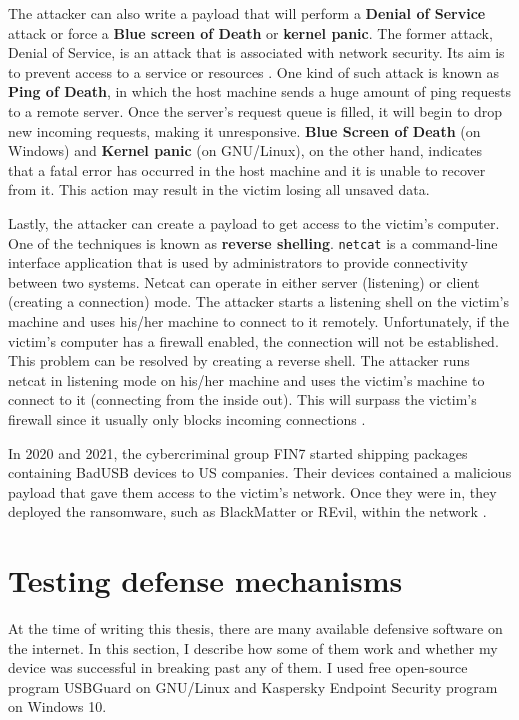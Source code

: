 The attacker can also write a payload that will perform a \textbf{Denial of Service} attack or force a \textbf{Blue screen of Death} or \textbf{kernel panic}. The former attack, Denial of Service, is an attack that is associated with network security. Its aim is to prevent access to a service or resources \cite{2008Ericson}. One kind of such attack is known as \textbf{Ping of Death}, in which the host machine sends a huge amount of ping requests to a remote server. Once the server's request queue is filled, it will begin to drop new incoming requests, making it unresponsive. \textbf{Blue Screen of Death} (on Windows) and \textbf{Kernel panic} (on GNU/Linux), on the other hand, indicates that a fatal error has occurred in the host machine and it is unable to recover from it. This action may result in the victim losing all unsaved data.

Lastly, the attacker can create a payload to get access to the victim's computer. One of the techniques is known as \textbf{reverse shelling}. \verb|netcat| is a command-line interface application that is used by administrators to provide connectivity between two systems. Netcat can operate in either server (listening) or client (creating a connection) mode. The attacker starts a listening shell on the victim's machine and uses his/her machine to connect to it remotely. Unfortunately, if the victim's computer has a firewall enabled, the connection will not be established. This problem can be resolved by creating a reverse shell. The attacker runs netcat in listening mode on his/her machine and uses the victim's machine to connect to it (connecting from the inside out). This will surpass the victim's firewall since it usually only blocks incoming connections \cite{WilhelmThomas2010Ppt}.

In 2020 and 2021, the cybercriminal group FIN7 started shipping packages containing BadUSB devices to US companies. Their devices contained a malicious payload that gave them access to the victim's network. Once they were in, they deployed the ransomware, such as BlackMatter or REvil, within the network \cite{gatlan_2022} \cite{ilascu_2020}.


\chapter{Testing defense mechanisms}
\label{ch:testing_defense}
At the time of writing this thesis, there are many available defensive software on the internet. In this section, I describe how some of them work and whether my device was successful in breaking past any of them. I used free open-source program USBGuard on GNU/Linux and Kaspersky Endpoint Security program on Windows 10.

